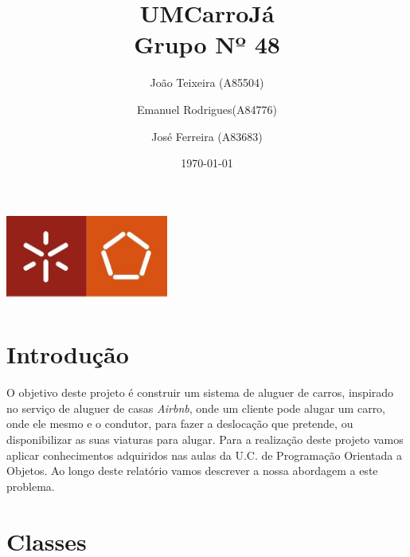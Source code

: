 \documentclass[a4paper]{report}
\begin{document}
\title{UMCarroJá\\ 
\large Grupo Nº 48}
\author{João Teixeira (A85504) \and Emanuel Rodrigues(A84776) \and José Ferreira (A83683)}
\date{\today}

\begin{center}
    \begin{minipage}{0.75\linewidth}
        \centering
        \includegraphics[width=0.4\textwidth]{eng.jpeg}\par\vspace{1cm}
        \vspace{1.5cm}
        \href{https://www.uminho.pt/PT}
        {\color{black}{\scshape\LARGE Universidade do Minho}} \par
        \vspace{1cm}
        {\color{black}{\scshape\Large Programação Orientada a Objetos}} \par
        \vspace{1.5cm}
        \maketitle
    \end{minipage}
\end{center}

\tableofcontents

\pagebreak

\chapter{Introdução}

O objetivo deste projeto é construir um sistema de aluguer de carros,
inspirado no serviço de aluguer de casas \textit{Airbnb}, onde um cliente
pode alugar um carro, onde ele mesmo e o condutor, para fazer a deslocação
que pretende, ou disponibilizar as suas viaturas para alugar. Para a realização
deste projeto vamos aplicar conhecimentos adquiridos nas aulas da U.C. de 
Programação Orientada a Objetos.
Ao longo deste relatório vamos descrever a nossa abordagem a este problema.

\chapter{Classes}\label{chap:api}
\end{document}
